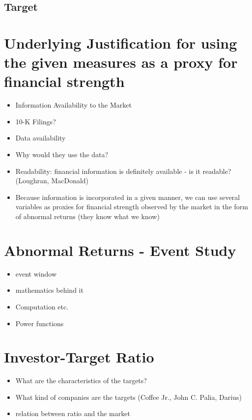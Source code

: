 \documentclass[12pt]{article}
\begin{document}
\subsection{Target}

\section{Underlying Justification for using the given measures as a proxy for financial strength}

    \begin{itemize}
        \item Information Availability to the Market
        \item 10-K Filings? 
        \item Data availability
        \item Why would they use the data?
        \item Readability: financial information is definitely available - is it readable? (Loughran, MacDonald)
        \item Because information is incorporated in a given manner, we can use several variables as proxies for financial strength observed by the market in the form of abnormal returns (they know what we know)
    \end{itemize}

\section{Abnormal Returns - Event Study} 
    \begin{itemize}
        \item event window
        \item mathematics behind it 
        \item Computation etc.
        \item Power functions 
    \end{itemize}

\section{Investor-Target Ratio} 

    \begin{itemize}
        \item What are the characteristics of the targets? 
        \item What kind of companies are the targets (Coffee Jr., John C.
        Palia, Darius)
        \item relation between ratio and the market 
    \end{itemize}
\end{document}

